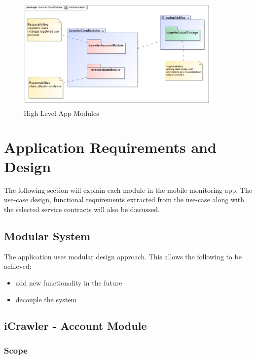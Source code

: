 \documentclass[hidelinks, 12pt, oneside]{article}
\begin{document}
			\begin{figure}[!htbp]
    			\centering
    			\includegraphics[width=0.9\textwidth]{img/highLevelSystem.jpg}
    			\caption{High Level App Modules}
    			\label{fig:highLevelSystem}
			\end{figure}


	\section{Application Requirements and Design}
	The following section will explain each module in the mobile monitoring app. The use-case design, functional requirements extracted from the use-case along with the selected service contracts will also be discussed.\newline
	
	\subsection{Modular System}
	 The application uses modular design approach. This allows the following to be achieved:
	 \begin{itemize}
	\item add new functionality in the future
 	\item decouple the system
	\end{itemize}


	
	\subsection{iCrawler - Account Module}
	\subsubsection{Scope}
	
\end{document}
